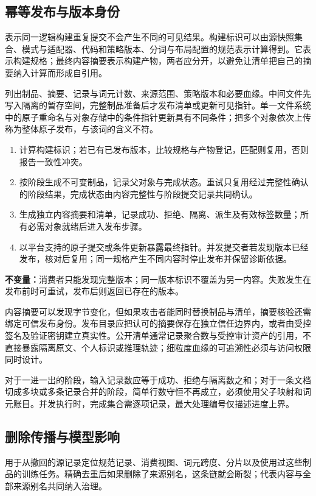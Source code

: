 \documentclass[../textbook.tex]{subfiles}
\begin{document}
\subsection{幂等发布与版本身份}
表示同一逻辑构建重复提交不会产生不同的可见结果。构建标识可以由源快照集合、模式与适配器、代码和策略版本、分词与布局配置的规范表示计算得到。它表示构建规格；最终内容摘要表示构建产物，两者应分开，以避免让清单把自己的摘要纳入计算而形成自引用。

列出制品、摘要、记录与词元计数、来源范围、策略版本和必要血缘。中间文件先写入隔离的暂存空间，完整制品准备后才发布清单或更新可见指针。单一文件系统中的原子重命名与对象存储中的条件指针更新具有不同条件；把多个对象依次上传称为整体原子发布，与该词的含义不符。

\begin{algorithm}[可重试的数据版本发布]
\begin{enumerate}
\item 计算构建标识；若已有已发布版本，比较规格与产物登记，匹配则复用，否则报告一致性冲突。
\item 按阶段生成不可变制品，记录父对象与完成状态。重试只复用经过完整性确认的阶段结果，完成状态由内容完整性与阶段提交记录共同确认。
\item 生成独立内容摘要和清单，记录成功、拒绝、隔离、派生及有效标签数量；所有必需对象就绪后进入发布步骤。
\item 以平台支持的原子提交或条件更新暴露最终指针。并发提交者若发现版本已经发布，核对后复用；同一规格产生不同内容时停止发布并保留诊断依据。
\end{enumerate}
\textbf{不变量：}消费者只能发现完整版本；同一版本标识不覆盖为另一内容。失败发生在发布前时可重试，发布后则返回已存在的版本。
\end{algorithm}

内容摘要可以发现字节变化，但如果攻击者能同时替换制品与清单，摘要核验还需绑定可信发布身份。发布目录应把认可的摘要保存在独立信任边界内，或者由受控签名及验证密钥建立真实性。公开清单通常记录聚合数与受控审计资产的引用，不直接暴露隔离原文、个人标识或推理轨迹；细粒度血缘的可追溯性必须与访问权限同时设计。

对于一进一出的阶段，输入记录数应等于成功、拒绝与隔离数之和；对于一条文档切成多块或多条记录合并的阶段，简单行数守恒不再成立，必须使用父子映射和词元账目。并发执行时，完成集合需逐项记录，最大处理编号仅描述进度上界。

\subsection{删除传播与模型影响}
用于从撤回的源记录定位规范记录、消费视图、词元跨度、分片以及使用过这些制品的训练任务。精确去重后如果删除了来源别名，这条链就会断裂；代表内容与全部来源别名共同纳入治理。
\end{document}
